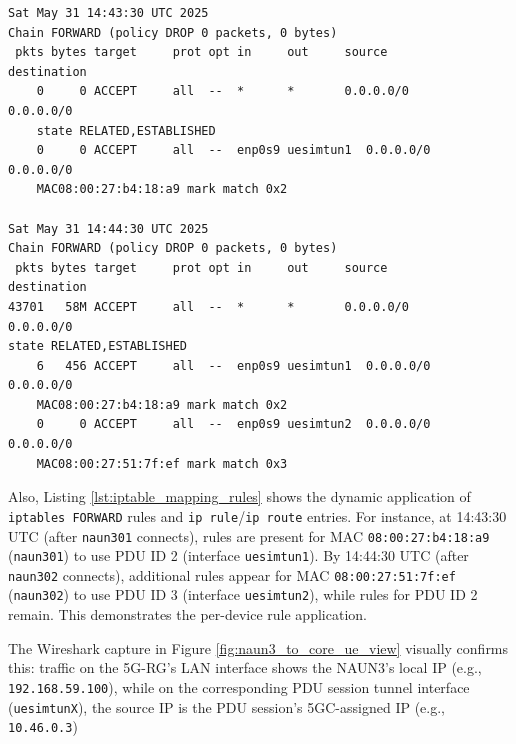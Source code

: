 \begin{lstlisting}[caption=\texttt{iptables} mapping rules and tables for segregating traffic,label={lst:iptable_mapping_rules}]
Sat May 31 14:43:30 UTC 2025
Chain FORWARD (policy DROP 0 packets, 0 bytes)
 pkts bytes target     prot opt in     out     source           destination         
    0     0 ACCEPT     all  --  *      *       0.0.0.0/0        0.0.0.0/0            
    state RELATED,ESTABLISHED
    0     0 ACCEPT     all  --  enp0s9 uesimtun1  0.0.0.0/0        0.0.0.0/0            
    MAC08:00:27:b4:18:a9 mark match 0x2

Sat May 31 14:44:30 UTC 2025
Chain FORWARD (policy DROP 0 packets, 0 bytes)
 pkts bytes target     prot opt in     out     source           destination         
43701   58M ACCEPT     all  --  *      *       0.0.0.0/0        0.0.0.0/0            
state RELATED,ESTABLISHED
    6   456 ACCEPT     all  --  enp0s9 uesimtun1  0.0.0.0/0        0.0.0.0/0            
    MAC08:00:27:b4:18:a9 mark match 0x2
    0     0 ACCEPT     all  --  enp0s9 uesimtun2  0.0.0.0/0        0.0.0.0/0            
    MAC08:00:27:51:7f:ef mark match 0x3
\end{lstlisting}

Also, Listing \ref{lst:iptable_mapping_rules} shows the dynamic application of \texttt{iptables FORWARD} rules and \texttt{ip rule}/\texttt{ip route} entries. For instance, at 14:43:30 \ac{UTC} (after \texttt{naun301} connects), rules are present for \ac{MAC} \texttt{08:00:27:b4:18:a9} (\texttt{naun301}) to use \ac{PDU} ID 2 (interface \texttt{uesimtun1}). By 14:44:30 \ac{UTC} (after \texttt{naun302} connects), additional rules appear for \ac{MAC} \texttt{08:00:27:51:7f:ef} (\texttt{naun302}) to use \ac{PDU} ID 3 (interface \texttt{uesimtun2}), while rules for \ac{PDU} ID 2 remain. This demonstrates the per-device rule application.

The Wireshark capture in Figure \ref{fig:naun3_to_core_ue_view} visually confirms this: traffic on the \ac{5G-RG}'s \ac{LAN} interface shows the \ac{NAUN3}'s local \ac{IP} (e.g., \texttt{192.168.59.100}), while on the corresponding \ac{PDU} session tunnel interface (\texttt{uesimtunX}), the source \ac{IP} is the \ac{PDU} session's \ac{5GC}-assigned \ac{IP} (e.g., \texttt{10.46.0.3})


